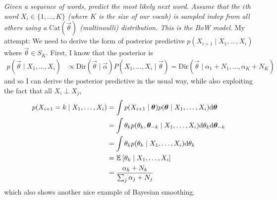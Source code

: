 \documentclass[11pt]{article}
\begin{document}
\begin{example}
	\textit{Given a sequence of words, predict the most likely next word. Assume that the $i$th word $X_i \in \{1, \ldots, K\}$ (where $K$ is the size of our vocab) is sampled indep from all others using a $\text{Cat}(\vec\theta)$ (multinoulli) distribution. This is the BoW model.}
	\tcblower
	My attempt: We need to derive the form of posterior predictive $p(X_{i+1} \mid X_1, \ldots, X_i)$ where $\vec\theta \in S_K$. First, I know that the posterior is
	\begin{align}
		p(\vec\theta \mid X_1, \ldots, X_i)
			&\propto \text{Dir}(\vec\theta \mid \vec\alpha) P(X_1, \ldots, X_i \mid \vec\theta) 
			= \text{Dir}(\vec\theta \mid \alpha_1 + N_1, \ldots, \alpha_K + N_K)
	\end{align}
	and so I can derive the posterior predictive in the usual way, while also exploiting the fact that all $X_i \perp X_j$,
	\begin{align}
		p(X_{i+1} = k \mid X_1, \ldots, X_i)
			&= \int p(X_{i+1} \mid \vec\theta) p(\vec\theta \mid X_1, \ldots, X_i)  \mathrm{d}\vec\theta \\
			&= \int \theta_k  
			  p(\theta_k, \vec[-k]{\theta}  \mid X_1, \ldots, X_i)
			  \mathrm{d}\theta_k \mathrm{d}\vec[-k]{\theta} \\
			&= \int \theta_k p(\theta_k \mid X_1, \ldots, X_i) \mathrm{d}\theta_k \\
			&= \E{\theta_k \mid X_1, \ldots, X_i} \\
			&= \frac{\alpha_k + N_k}{\sum_j \alpha_j + N_j}
	\end{align}
	which also shows another nice example of Bayesian smoothing. 
\end{example}
\end{document}
